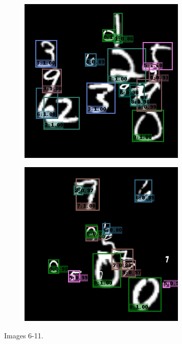 \begin{figure}
\begin{subfigure}[b]{0.49\textwidth}
  \end{subfigure}
  ~
  \begin{subfigure}[b]{0.49\textwidth}
    \centering
    \includegraphics[width=\textwidth]{figures/10.png}
  \end{subfigure}
  \begin{subfigure}[b]{0.49\textwidth}
    \centering
    \includegraphics[width=\textwidth]{figures/11.png}
  \end{subfigure}
  \caption{Images 6-11.}
  \label{fig:task4:e2}
\end{figure}

